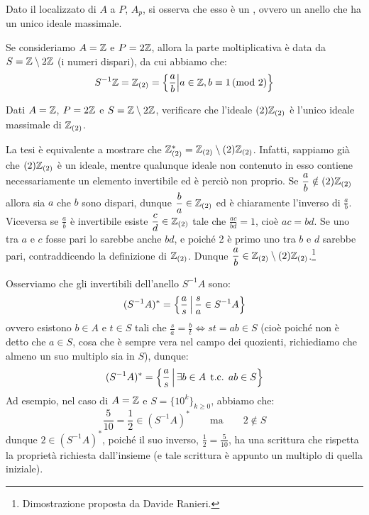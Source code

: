 \documentclass[11pt]{scrartcl}
\begin{document}
\begin{remark}
    Dato il localizzato di $A$ a $P$, $A_p$, si osserva che esso è un , ovvero un anello che ha un unico ideale massimale.
\end{remark}

\begin{example}
    Se consideriamo $A = \mathbb Z$ e $P = 2\mathbb Z$, allora la parte moltiplicativa è data da $S = \mathbb Z\setminus 2\mathbb Z$ (i numeri dispari), da cui abbiamo che:
    \[ S^{-1}\mathbb Z = \mathbb Z_{(2)} = \left\{\frac{a}{b} \middle| a \in \mathbb Z, b \equiv 1 \, \text{(mod 2)}\right\}
        \]
\end{example}

\begin{exercise}
    Dati $A = \mathbb Z$, $P = 2\mathbb Z$ e $S = \mathbb Z\setminus 2\mathbb Z$, verificare che l'ideale $(2)\mathbb Z_{(2)}$ è l'unico ideale massimale di $\mathbb Z_{(2)}$.
\end{exercise}

\begin{soln}
    La tesi è equivalente a mostrare che $\mathbb Z_{(2)}^*=\mathbb Z_{(2)}\setminus (2)\mathbb Z_{(2)}$. Infatti, sappiamo già che 
    $(2)\mathbb Z_{(2)}$ è un ideale, mentre qualunque ideale non contenuto in esso contiene necessariamente un elemento invertibile ed è perciò non proprio.
    Se $\displaystyle\frac{a}{b}\notin (2)\mathbb Z_{(2)}$ allora sia $a$ che $b$ sono dispari, dunque $\displaystyle\frac{b}{a}\in\mathbb Z_{(2)}$ ed è chiaramente l'inverso di $\displaystyle\frac{a}{b}$.
    Viceversa se $\displaystyle\frac{a}{b}$ è invertibile esiste $\displaystyle\frac{c}{d}\in\mathbb Z_{(2)}$ tale che $\displaystyle\frac{ac}{bd}=1$, cioè $ac=bd$. Se uno tra $a$ e $c$ fosse pari lo sarebbe
    anche $bd$, e poiché 2 è primo uno tra $b$ e $d$ sarebbe pari, contraddicendo la definizione di $\mathbb Z_{(2)}$. Dunque $\displaystyle\frac{a}{b}\in\mathbb Z_{(2)}\setminus (2)\mathbb Z_{(2)}$.\footnote{Dimostrazione proposta da Davide Ranieri.}
\end{soln}

\begin{remark}
    Osserviamo che gli invertibili dell'anello $S^{-1}A$ sono:
    \[ (S^{-1}A)^* = \left\{\frac{a}{s} \,\middle|\, \frac{s}{a} \in S^{-1}A\right\}
        \]
    ovvero esistono $b \in A$ e $t \in S$ tali che $\displaystyle \frac{s}{a} = \frac{b}{t} \iff st = ab \in S$ (cioè poiché non è detto che $a \in S$, cosa che è sempre vera nel campo dei quozienti, richiediamo che almeno un suo multiplo sia in $S$), dunque:
    \[ (S^{-1}A)^* = \left\{\frac{a}{s} \,\middle|\, \exists b \in A \;\, \text{t.c.} \;\, ab \in S\right\}
        \]
    Ad esempio, nel caso di $A = \mathbb Z$ e $S = \{10^k\}_{k\geq 0}$, abbiamo che:
    \[ \frac{5}{10}=\frac{1}{2} \in (S^{-1}A)^* \qquad \text{ma} \qquad 2 \not \in S
        \]
    dunque $2 \in (S^{-1}A)^*$, poiché il suo inverso, $\displaystyle \frac{1}{2} = \frac{5}{10}$, ha una scrittura che rispetta la proprietà richiesta dall'insieme (e tale scrittura è appunto un multiplo di quella iniziale).
\end{remark}
\end{document}
